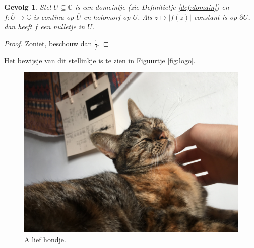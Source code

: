 \documentclass{article}
\newtheorem{corollary}{Gevolg}[theorem]
\theoremstyle{definition}
\theoremstyle{remark}
\begin{document}
\begin{corollary}
Stel $U \subseteq \mathbb{C}$ is een domeintje (zie Definitietje \ref{def:domain}) en $f: \overline{U} \rightarrow \mathbb{C}$ is continu op $\overline{U}$ en holomorf op $U$. Als $z \mapsto |f(z)|$ constant is op $\partial U$, dan heeft $f$ een nulletje in $U$.
\end{corollary}
\begin{proof}
Zoniet, beschouw dan $\frac{1}{f}$.
\end{proof}
Het bewijsje van dit stellinkje is te zien in Figuurtje \ref{fig:logo}.

\begin{figure}
    \centering
    \includegraphics[width=.7\textwidth]{img/cat.jpg}
    \caption{A lief hondje.}
    \label{fig:my_label}
\end{figure}

\newpage

% 




\end{document}

